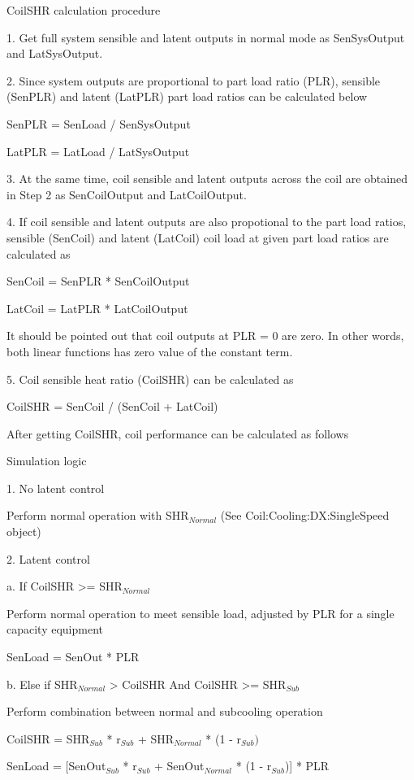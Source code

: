 CoilSHR calculation procedure

1. Get full system sensible and latent outputs in normal mode as SenSysOutput and LatSysOutput.

2. Since system outputs are proportional to part load ratio (PLR), sensible (SenPLR) and latent (LatPLR) part load ratios can be calculated below

	SenPLR = SenLoad / SenSysOutput

	LatPLR = LatLoad / LatSysOutput

3. At the same time, coil sensible and latent outputs across the coil are obtained in Step 2 as SenCoilOutput and LatCoilOutput.

4. If coil sensible and latent outputs are also propotional to the part load ratios, sensible (SenCoil) and latent (LatCoil) coil load at given part load ratios are calculated as

	SenCoil = SenPLR * SenCoilOutput

	LatCoil = LatPLR * LatCoilOutput

It should be pointed out that coil outputs at PLR = 0 are zero.  In other words, both linear functions has zero value of the constant term.

5. Coil sensible heat ratio (CoilSHR) can be calculated as

	CoilSHR = SenCoil / (SenCoil + LatCoil)

After getting CoilSHR, coil performance can be calculated as follows

Simulation logic

1. No latent control

   Perform normal operation with SHR\(_{Normal}\) (See Coil:Cooling:DX:SingleSpeed object)

2. Latent control

a.  If CoilSHR >= SHR\(_{Normal}\)

   Perform normal operation to meet sensible load, adjusted by PLR for a single capacity equipment

	SenLoad = SenOut * PLR

b.  Else if SHR\(_{Normal}\) > CoilSHR And CoilSHR >= SHR\(_{Sub}\)

   Perform combination between normal and subcooling operation

  CoilSHR = SHR\(_{Sub}\) * r\(_{Sub}\) + SHR\(_{Normal}\) * (1 - r\(_{Sub})\)

  SenLoad = [SenOut\(_{Sub}\) * r\(_{Sub}\) + SenOut\(_{Normal}\) * (1 - r\(_{Sub}\))] * PLR

